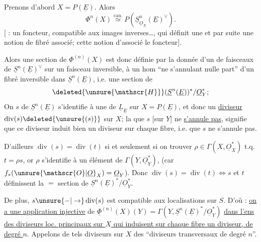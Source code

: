 Prenons d'abord $X=P(\underline{E})$. Alors
\[
\Phi^n(X)\overset{\text{can.}}{\simeq}P(\underline{S}^{n}_{\underline{O}_{X}}(\underline{E})^{\vee}).
\]
[ :  un foncteur, compatible aux images inverses\ldots, qui définit une  et par suite une notion de fibré associé;  cette  notion d'associé  le foncteur].

 Alors une section de $\Phi^{(n)}(X)$ est donc définie par  la donnée d'un  de faisceaux de $\underline{S}^{n}(\underline{E})^{\vee}$ sur un  faisceau inversible,  à un hom ``ne s'annulant nulle part'' d'un fibré inversible dans $\underline{S}^{n}(\underline{E})$, i.e. une section de
\[
\deleted{\unsure{\mathscr{H}}}(\underline{S}^{n}(\underline{E}))^{*}/\underline{O}_{Y}^{*};
\]
On 
 $s$ de $\underline{S}^{n}(\underline{E})$ s'identifie à une  de $\underline{L}_{\underline{E}}$ sur $X=P(\underline{E})$, et   donc un \uline{diviseur} $\operatorname{div}(s)\deleted{\unsure{(s)}}$ sur $X$; la  que $s$ [sur $Y$] ne \uline{s'annule pas}, signifie que ce diviseur induit bien un diviseur sur chaque fibre,  i.e. que $s$ ne s'annule pas.

D'ailleurs  $\operatorname{div}(s)=\operatorname{div}(t)$  si et seulement si on  trouver $\rho\in\Gamma(X,\underline{O}_X^*)$ t.q. $t=\rho s$, or $\rho$ s'identifie à un élément de $\Gamma(Y,\underline{O}_Y^*)$, (car $f_*(\unsure{\mathscr{O}|\underline{O}}_X)=\underline{O}_Y$). Donc $\operatorname{div}(s)=\operatorname{div}(t)\Leftrightarrow s$ et $t$ définissent la $=$ section de $\underline{S}^{n}(\underline{E})^*/\underline{O}_Y^*$.

De plus, $s\unsure{-|\to}\operatorname{div}(s)$ est compatible aux localisations sur $S$. D'où : \uline{on a une application injective} de \deleted{$\unsure{\Phi|\varphi}$} $\underline{\Phi}^{(n)}(X)(Y)=\Gamma(Y,\underline{S}^{n}(\underline{E})^*/\underline{O}_Y^*)$ \uline{dans l'ens des diviseurs loc. principaux  sur $X$ qui induisent  sur chaque fibre un diviseur,  de degré $n$}. Appelons de tels diviseurs sur $X$ des ``diviseurs transversaux de degré $n$''.

